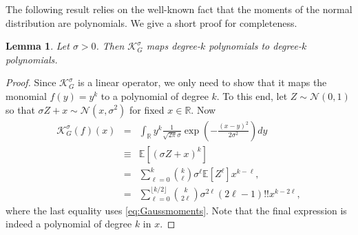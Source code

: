 \documentclass[11pt]{article}
\newtheorem{lemma}[defin]{Lemma}
\theoremstyle{definition}
\begin{document}
The following result {relies on} the well-known fact that the moments of the normal distribution are polynomials.
{We give a short proof for completeness.}

\begin{lemma} \label{lem:Gaussianpoly}
Let $\sigma > 0$. Then $\mathcal K_G^\sigma$ maps degree-$k$ polynomials to degree-$k$ polynomials.
\end{lemma}
{\begin{proof}
Since  $\mathcal K_G^\sigma$ is a linear operator, we only need to show that it maps the monomial $f(y) = y^k$ to a polynomial of degree $k$.
To this end, let ${Z \sim \mathcal N(0,1)}$ so that $\sigma Z + x \sim \mathcal N(x,\sigma^2)$ for fixed $x \in \mathbb{R}$.
Now
\begin{eqnarray*}
\mathcal K_G^\sigma(f)(x) &=& \int_{\mathbb{R}}y^k\frac{1}{\sqrt{2\pi}\sigma}\exp{\left(-\frac{(x-y)^2}{2\sigma^2}\right)}dy \\
&\equiv & \mathbb{E}\left[(\sigma Z + x)^k \right] \\
&=&  \sum_{\ell =0}^k {k \choose \ell} \sigma^\ell \mathbb{E}\left[Z^\ell\right]x^{k-\ell}, \\
&=& \sum_{\ell =0}^{\lfloor k/2 \rfloor} {k \choose 2\ell} \sigma^{2\ell}(2\ell-1)!!  x^{k -  2\ell},
\end{eqnarray*}
where the last equality uses \eqref{eq:Gaussmoments}. Note that the final expression is indeed a polynomial of degree $k$ in $x$.
\end{proof}
}
\end{document}
